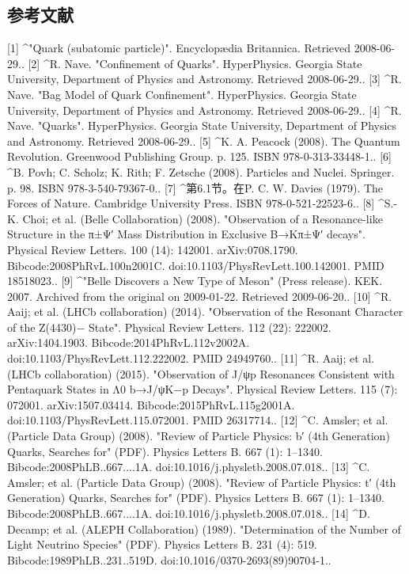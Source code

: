 \subsection{参考文献}
[1]
^"Quark (subatomic particle)". Encyclopædia Britannica. Retrieved 2008-06-29..
[2]
^R. Nave. "Confinement of Quarks". HyperPhysics. Georgia State University, Department of Physics and Astronomy. Retrieved 2008-06-29..
[3]
^R. Nave. "Bag Model of Quark Confinement". HyperPhysics. Georgia State University, Department of Physics and Astronomy. Retrieved 2008-06-29..
[4]
^R. Nave. "Quarks". HyperPhysics. Georgia State University, Department of Physics and Astronomy. Retrieved 2008-06-29..
[5]
^K. A. Peacock (2008). The Quantum Revolution. Greenwood Publishing Group. p. 125. ISBN 978-0-313-33448-1..
[6]
^B. Povh; C. Scholz; K. Rith; F. Zetsche (2008). Particles and Nuclei. Springer. p. 98. ISBN 978-3-540-79367-0..
[7]
^第6.1节。在P. C. W. Davies (1979). The Forces of Nature. Cambridge University Press. ISBN 978-0-521-22523-6..
[8]
^S.-K. Choi; et al. (Belle Collaboration) (2008). "Observation of a Resonance-like Structure in the π±Ψ′ Mass Distribution in Exclusive B→Kπ±Ψ′ decays". Physical Review Letters. 100 (14): 142001. arXiv:0708.1790. Bibcode:2008PhRvL.100n2001C. doi:10.1103/PhysRevLett.100.142001. PMID 18518023..
[9]
^"Belle Discovers a New Type of Meson" (Press release). KEK. 2007. Archived from the original on 2009-01-22. Retrieved 2009-06-20..
[10]
^R. Aaij; et al. (LHCb collaboration) (2014). "Observation of the Resonant Character of the Z(4430)− State". Physical Review Letters. 112 (22): 222002. arXiv:1404.1903. Bibcode:2014PhRvL.112v2002A. doi:10.1103/PhysRevLett.112.222002. PMID 24949760..
[11]
^R. Aaij; et al. (LHCb collaboration) (2015). "Observation of J/ψp Resonances Consistent with Pentaquark States in Λ0 b→J/ψK−p Decays". Physical Review Letters. 115 (7): 072001. arXiv:1507.03414. Bibcode:2015PhRvL.115g2001A. doi:10.1103/PhysRevLett.115.072001. PMID 26317714..
[12]
^C. Amsler; et al. (Particle Data Group) (2008). "Review of Particle Physics: b′ (4th Generation) Quarks, Searches for" (PDF). Physics Letters B. 667 (1): 1–1340. Bibcode:2008PhLB..667....1A. doi:10.1016/j.physletb.2008.07.018..
[13]
^C. Amsler; et al. (Particle Data Group) (2008). "Review of Particle Physics: t′ (4th Generation) Quarks, Searches for" (PDF). Physics Letters B. 667 (1): 1–1340. Bibcode:2008PhLB..667....1A. doi:10.1016/j.physletb.2008.07.018..
[14]
^D. Decamp; et al. (ALEPH Collaboration) (1989). "Determination of the Number of Light Neutrino Species" (PDF). Physics Letters B. 231 (4): 519. Bibcode:1989PhLB..231..519D. doi:10.1016/0370-2693(89)90704-1..
